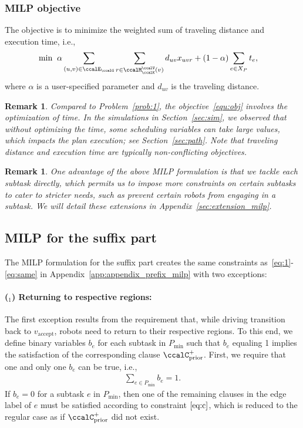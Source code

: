 \documentclass[Afour,sageh,times]{sagej}
\newtheorem{rem}[thm]{Remark}
\newcounter{mycounter}
\begin{document}
{{{{\subsubsection{MILP objective} The objective is to minimize the weighted sum of traveling distance and execution time, i.e.,
\begingroup\makeatletter\def\f@size{10}\check@mathfonts
\def\maketag@@@#1{\hbox{\m@th\normalsize\normalfont#1}}%
\begin{align}\label{equ:obj}
  \min \; \;&  \alpha \sum_{(u,v)\in \ccalE_\ccalG}  \sum_{r \in \ccalM^\ccalV_{\ccalK}(v)} d_{uv} x_{uvr} +  (1 - \alpha) \sum_{e\in X_P} t_e,
\end{align}
 \endgroup
  where $\alpha$ is a user-specified parameter and  $d_{uv}$ is the traveling distance.
  \begin{rem}
   Compared to Problem~\ref{prob:1}, the objective~\eqref{equ:obj} involves the optimization of time. In the simulations in Section~\ref{sec:sim}, we observed that without optimizing the time, some scheduling variables can take large values, which impacts the plan execution; see Section~\ref{sec:path}. Note that traveling distance and execution time are typically non-conflicting objectives.
  \end{rem}
  \begin{rem}
    One advantage of the above MILP formulation is that we tackle each subtask directly,  which permits us to impose more constraints on certain subtasks to cater to stricter needs, such as prevent certain robots from engaging in a subtask. We will detail these extensions in Appendix~\ref{sec:extension_milp}.
  \end{rem}
                }}

\subsection{MILP for the suffix part}\label{app:appendix_suffix_milp}
                The MILP formulation for the suffix part creates the same  constraints as~\eqref{eq:1}-\eqref{eq:same} in Appendix~\ref{app:appendix_prefix_milp} with two exceptions:

\paragraph{($_1$) Returning to respective regions:} The first exception results from the requirement that, while driving transition back to $v_{\text{accept}}$, robots need to return to their respective regions.
To this end, we define binary variables $b_e$ for each subtask in $P_{\text{min}}$ such that $b_e$ equaling 1 implies the satisfaction of the corresponding clause $\ccalC_{\text{prior}}^+$. First, we require that one  and only one $b_e$ can be true, i.e.,
\begin{align}\label{eq:one_suffix}
  \sum_{e \in P_{\text{min}}} b_e = 1.
\end{align}
If $b_e=0$ for a subtask $e$ in $P_{\text{min}}$, then one of the remaining clauses in the edge label of $e$ must be satisfied according to constraint $\eqref{eq:c}$, which is reduced to the regular case as if  $\ccalC_{\text{prior}}^+$  did not exist.

}}
\end{document}
